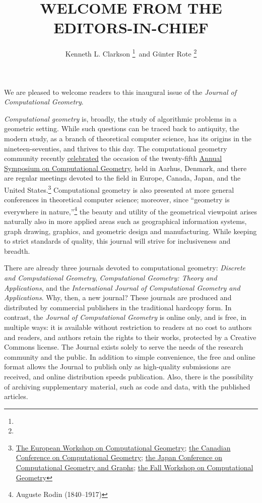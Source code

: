 \documentclass{jocg}
\title{
  \MakeUppercase{Welcome from the Editors-in-Chief}
}
\author{Kenneth L. Clarkson%
        \thanks{\affil{IBM Almaden}}\,
        and G\"unter Rote%
        \thanks{\affil{Freie Universit\"at Berlin}}}
\theoremstyle{plain}
\theoremstyle{definition}
\begin{document}
\maketitle

We are pleased to welcome readers to this inaugural issue of the
\textit{Journal of Computational Geometry}.

\textit{Computational geometry} is, broadly, the study of algorithmic problems in a
geometric setting. While such questions can be traced back to antiquity, the modern
study, as a branch of theoretical computer science, has its origins in the
nineteen-seventies, and thrives to this day. The computational geometry community recently
\href{http://www.madalgo.au.dk/socg2009/Html/Sattelite Events/25_Anniversary.html}{celebrated}
the occasion of the twenty-fifth \href{http://www.madalgo.au.dk/socg2009/index.html}{Annual Symposium on Computational Geometry},
held in Aarhus, Denmark, and there are regular meetings devoted to the field in 
Europe, Canada, Japan, and the United States.\footnote{%
\href{http://www.eurocg.org/}{The European Workshop on Computational Geometry};
\href{http://www.cccg.ca/}{the Canadian Conference on Computational Geometry};
\href{http://www.jaist.ac.jp/~uehara/JCCGG09/}{the Japan Conference on Computational Geometry and Graphs};
\href{http://www.cs.tufts.edu/research/geometry/FWCG09/}{the Fall Workshop on Computational Geometry}
} Computational geometry is also presented at more general conferences
in theoretical computer science; moreover, since ``geometry is everywhere in
nature,''\footnote{Auguste Rodin (1840--1917)} the beauty and utility of the geometrical
viewpoint arises naturally also in more applied areas such as geographical
information systems, graph drawing, graphics, and geometric design and
manufacturing. While keeping to strict standards of quality, this journal
will strive for inclusiveness and breadth.

There are already three journals devoted to computational geometry:
\textit{Discrete and Computational Geometry},
\textit{Computational Geometry: Theory and Applications},
and the
\textit{International Journal of Computational Geometry and Applications}.
Why, then, a new journal? These journals are produced and distributed
by commercial publishers in the traditional hardcopy form.
In contrast, the \textit{Journal of Computational Geometry} is
online only, and is free, in multiple ways: it is available
without restriction to readers
at no cost to authors and readers, and authors retain the rights to their works,
protected by a Creative Commons license. The Journal exists solely to serve
the needs of the research community and the public. In addition to simple
convenience, the free and online format allows the Journal to publish only as
high-quality submissions are received, and online distribution speeds
publication. Also, there is the possibility of archiving supplementary
material, such as code and data, with the published articles.
\end{document}
